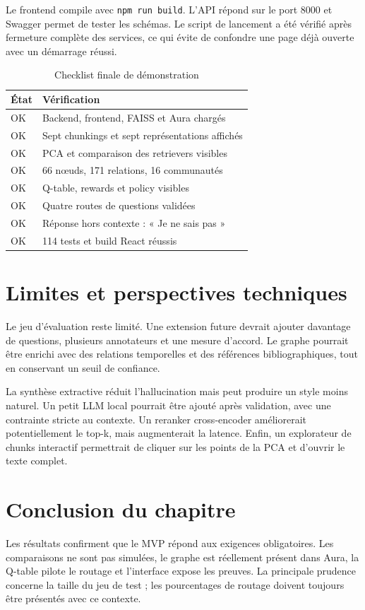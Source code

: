 \documentclass[12pt,a4paper,oneside]{report}
\newcommand{\tech}[1]{\texttt{#1}}
\begin{document}
Le frontend compile avec \tech{npm run build}. L'API répond sur le port 8000 et Swagger permet de tester les schémas. Le script de lancement a été vérifié après fermeture complète des services, ce qui évite de confondre une page déjà ouverte avec un démarrage réussi.

\begin{table}[H]
\centering
\caption{Checklist finale de démonstration}
\begin{tabularx}{0.94\textwidth}{p{}X}
\toprule
\textbf{État} & \textbf{Vérification}\\
\midrule
OK & Backend, frontend, FAISS et Aura chargés\\
OK & Sept chunkings et sept représentations affichés\\
OK & PCA et comparaison des retrievers visibles\\
OK & 66 nœuds, 171 relations, 16 communautés\\
OK & Q-table, rewards et policy visibles\\
OK & Quatre routes de questions validées\\
OK & Réponse hors contexte : « Je ne sais pas »\\
OK & 114 tests et build React réussis\\
\bottomrule
\end{tabularx}
\end{table}

\section{Limites et perspectives techniques}
Le jeu d'évaluation reste limité. Une extension future devrait ajouter davantage de questions, plusieurs annotateurs et une mesure d'accord. Le graphe pourrait être enrichi avec des relations temporelles et des références bibliographiques, tout en conservant un seuil de confiance.

La synthèse extractive réduit l'hallucination mais peut produire un style moins naturel. Un petit LLM local pourrait être ajouté après validation, avec une contrainte stricte au contexte. Un reranker cross-encoder améliorerait potentiellement le top-k, mais augmenterait la latence. Enfin, un explorateur de chunks interactif permettrait de cliquer sur les points de la PCA et d'ouvrir le texte complet.

\section{Conclusion du chapitre}
Les résultats confirment que le MVP répond aux exigences obligatoires. Les comparaisons ne sont pas simulées, le graphe est réellement présent dans Aura, la Q-table pilote le routage et l'interface expose les preuves. La principale prudence concerne la taille du jeu de test ; les pourcentages de routage doivent toujours être présentés avec ce contexte.
\end{document}
